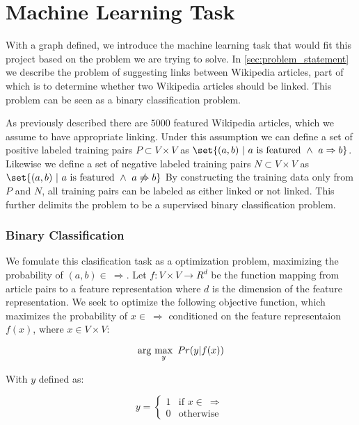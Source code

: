 \section{Machine Learning Task}\label{sec:machine_learning_task}
With a graph defined, we introduce the machine learning task that would fit this project based on the problem we are trying to solve. In \cref{sec:problem_statement} we describe the problem of suggesting links between Wikipedia articles, part of which is to determine whether two Wikipedia articles should be linked. This problem can be seen as a binary classification problem.

As previously described there are $5000$ featured Wikipedia articles, which we assume to have appropriate linking. Under this assumption we can define a set of positive labeled training pairs $P \subset V \times V$ as $\set{(a,b)\ |\ a\text{ is featured}\ \wedge\ a \Rightarrow b}$. Likewise we define a set of negative labeled training pairs $N \subset V \times V$ as $\set{(a,b)\ |\ a\text{ is featured}\ \wedge\ a \not\Rightarrow b}$
By constructing the training data only from $P$ and $N$, all training pairs can be labeled as either linked or not linked.  This further delimits the problem to be a supervised binary classification problem.
 
\subsubsection{Binary Classification}

We fomulate this clasification task as a optimization problem, maximizing the probability of $(a,b) \in \ \Rightarrow$. Let $f: V\times V \to R^d$ be the function mapping from article pairs to a feature representation where $d$ is the dimension of the feature representation.
We seek to optimize the following objective function, which maximizes the probability of $x \in \ \Rightarrow$ conditioned on the feature representaion $f(x)$, where $x \in V \times V$:

\begin{equation}
\label{objective}
\arg\ \!\max_y\ Pr(y | f(x))
\end{equation}

With $y$ defined as:

\[
    y= 
\begin{cases}
    1 & \text{if } x \in \  \Rightarrow\\
    0 & \text{otherwise}
\end{cases}
\]

